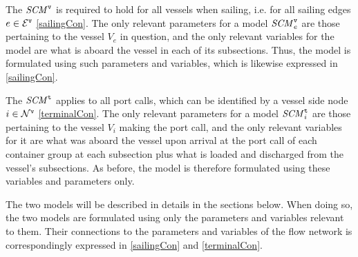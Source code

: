 The $\mathit{SCM}^\texttt{v}$ is required to hold for all vessels when sailing, i.e. for all sailing edges $e\in\mathcal{E}^\texttt{v}$ \eqref{sailingCon}. The only relevant parameters for a model $\mathit{SCM}^\texttt{v}_e$ are those pertaining to the vessel $V_e$ in question, and the only relevant variables for the model are what is aboard the vessel in each of its subsections. Thus, the model is formulated using such parameters and variables, which is likewise expressed in \eqref{sailingCon}. 

The $\mathit{SCM}^\texttt{t}$ applies to all port calls, which can be identified by a vessel side node $i\in \mathcal{N}^\texttt{v}$ \eqref{terminalCon}. The only relevant parameters for a model $\mathit{SCM}^\texttt{t}_i$ are those pertaining to the vessel $V_i$ making the port call, and the only relevant variables for it are what was aboard the vessel upon arrival at the port call of each container group at each subsection plus what is loaded and discharged from the vessel's subsections. As before, the model is therefore formulated using these variables and parameters only.    

The two models will be described in details in the sections below. When doing so, the two models are formulated using only the parameters and variables relevant to them. Their connections to the parameters and variables of the flow network is correspondingly expressed in \eqref{sailingCon} and \eqref{terminalCon}.

%

